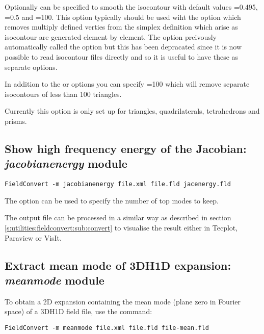 Optionally  can be specified to smooth the isocontour
with default values =0.495,
=0.5 and =100. This option
typically should be used wiht the  option which
removes multiply defined verties from the simplex definition which
arise as isocontour are generated element by element. The
 option preivously automatically called the
 option but this has been depracated since it is
now possible to read isocontour files directly and so it is useful to
have these as separate options.

In addition to the  or  options
you can specify =100 which will remove
separate isocontours of less than 100 triangles. 

\begin{notebox}
Currently this option is only set up for triangles, quadrilaterals,
 tetrahedrons and prisms. 
\end{notebox}
%
%
%
%

\subsection{Show high frequency energy of the Jacobian: \textit{jacobianenergy} module}

\begin{lstlisting}[style=BashInputStyle] 
FieldConvert -m jacobianenergy file.xml file.fld jacenergy.fld
\end{lstlisting}

The option  can be used to specify the number of top modes to
keep.

The output file  can be processed in a similar 
way as described in section \ref{s:utilities:fieldconvert:sub:convert}
to visualise the result either in Tecplot, Paraview or VisIt. 

%
%
%

\subsection{Extract mean mode of 3DH1D expansion: \textit{meanmode} module}

To obtain a 2D expansion containing the mean mode (plane zero in Fourier space) of a
3DH1D field file, use the command:
\begin{lstlisting}[style=BashInputStyle] 
FieldConvert -m meanmode file.xml file.fld file-mean.fld
\end{lstlisting}

